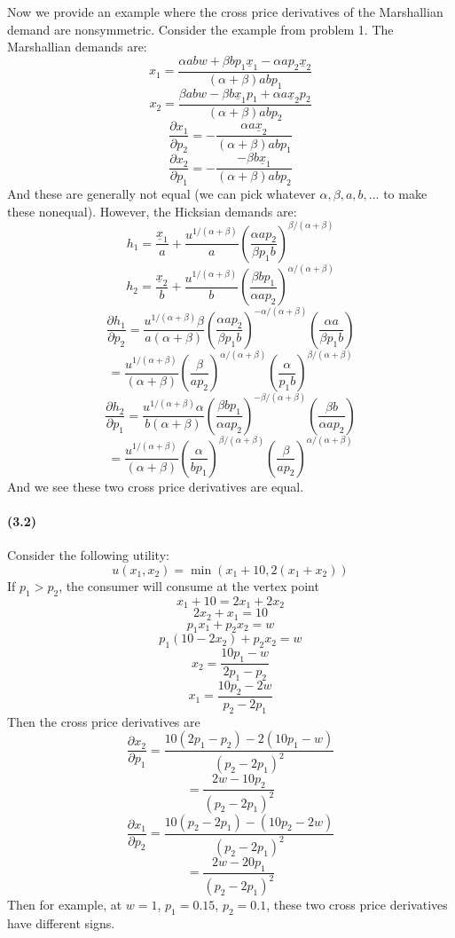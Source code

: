 \documentclass[10pt,letter]{article}
\begin{document}
Now we provide an example where the cross price derivatives of the Marshallian demand are nonsymmetric. Consider the example from problem 1. The Marshallian demands are:
\[ x_1  = \frac{\alpha ab w + \beta b p_1 \underline{x}_1 - \alpha a p_2 \underline{x}_2}{(\alpha + \beta)abp_1} \]
\[ x_2 = \frac{\beta a b w - \beta b \underline{x}_1 p_1 + \alpha a \underline{x}_2p_2}{(\alpha + \beta)ab p_2} \]
\[ \frac{\partial x_1}{\partial p_2} = - \frac{\alpha a\underline{x}_2}{(\alpha + \beta)abp_1} \]
\[ \frac{\partial x_2}{\partial p_1} = - \frac{- \beta b \underline{x}_1}{(\alpha + \beta)abp_2} \]
And these are generally not equal (we can pick whatever $\alpha, \beta, a, b, ...$ to make these nonequal).
However, the Hicksian demands are:
\[ h_1 = \frac{\underline{x}_1}{a} + \frac{u^{1/(\alpha+\beta)}}{a}\left( \frac{ \alpha a p_2}{\beta p_1 b} \right)^{\beta/(\alpha + \beta)}  \]
\[ h_2 = \frac{\underline{x}_2}{b} + \frac{u^{1/(\alpha+\beta)}}{b}\left( \frac{ \beta b p_1}{\alpha a p_2} \right)^{\alpha/(\alpha + \beta)}  \]
\[ \frac{\partial h_1}{\partial p_2} = \frac{u^{1/(\alpha+\beta)}\beta}{a(\alpha + \beta)}\left( \frac{ \alpha a p_2}{\beta p_1 b} \right)^{-\alpha/(\alpha + \beta)} \left(\frac{\alpha a}{\beta p_1 b} \right) \]
\[ = \frac{u^{1/(\alpha+\beta)}}{(\alpha + \beta)}\left( \frac{\beta }{ a p_2} \right)^{\alpha/(\alpha + \beta)} \left(\frac{\alpha }{ p_1 b} \right)^{\beta/(\alpha+\beta)} \]
\[ \frac{\partial h_2}{\partial p_1} = \frac{u^{1/(\alpha+\beta)}\alpha}{b(\alpha + \beta)}\left( \frac{ \beta b p_1}{\alpha a p_2} \right)^{-\beta/(\alpha + \beta)} \left(\frac{\beta b}{\alpha a p_2} \right) \]
\[= \frac{u^{1/(\alpha+\beta)}}{(\alpha + \beta)}\left( \frac{\alpha } { b p_1}\right)^{\beta/(\alpha + \beta)} \left(\frac{\beta }{ ap_2} \right)^{\alpha/(\alpha + \beta)}\]
And we see these two cross price derivatives are equal.
\paragraph{(3.2)}
Consider the following utility:
\[ u(x_1, x_2) = \min(x_1 + 10, 2(x_1 + x_2)) \]
If $p_1 > p_2$, the consumer will consume at the vertex point
\[ x_1 + 10 = 2x_1 + 2x_2 \]
\[ 2x_2 + x_1 = 10 \]
\[ p_1 x_1 + p_2 x_2 = w \]
\[ p_1 (10 - 2x_2) + p_2 x_2 = w\]
\[ x_2 = \frac{10 p_1 - w}{ 2p_1 - p_2} \]
\[ x_1 = \frac{10 p_2 - 2w}{p_2 - 2p_1} \]
Then the cross price derivatives are
\[ \frac{\partial x_2}{\partial p_1} = \frac{10( 2p_1 - p_2) - 2(10p_1 - w)}{(p_2 - 2p_1)^2}\]
\[ =  \frac{2w -10p_2}{(p_2 - 2p_1)^2}\]
\[ \frac{\partial x_1}{\partial p_2} = \frac{10(p_2 - 2p_1) - (10p_2 - 2w)}{(p_2 - 2p_1)^2}\]
\[ =  \frac{2w -20p_1}{(p_2 - 2p_1)^2}\]
Then for example, at $w=1$, $p_1 = 0.15$, $p_2 = 0.1$, these two cross price derivatives have different signs.
\end{document}
